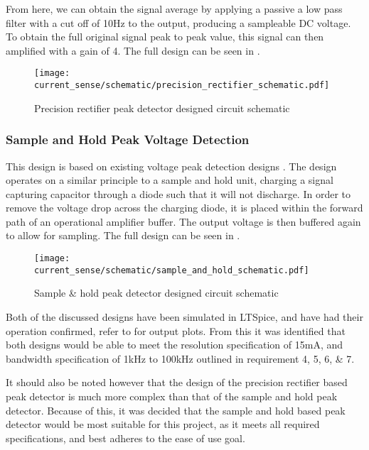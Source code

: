 From here, we can obtain the signal average by applying a passive a low pass filter with a cut off of 10Hz to the output, producing a sampleable DC voltage. To obtain the full original signal peak to peak value, this signal can then amplified with a gain of 4. The full design can be seen in .

\begin{figure}[!h]
    \centering
    \texttt{[image: current\_sense/schematic/precision\_rectifier\_schematic.pdf]}
    \caption{Precision rectifier peak detector designed circuit schematic}
    \label{F:precision_rectifier_circuit}
\end{figure}


\subsubsection*{Sample and Hold Peak Voltage Detection}\label{S:current_sense_sample_and_hold_design}

This design is based on existing voltage peak detection designs \cite{peak_detector_designs,LTC6244_peak_detector}. The design operates on a similar principle to a sample and hold unit, charging a signal capturing capacitor through a diode such that it will not discharge. In order to remove the voltage drop across the charging diode, it is placed within the forward path of an operational amplifier buffer. The output voltage is then buffered again to allow for sampling. The full design can be seen in .

\begin{figure}[!h]
    \centering
    \texttt{[image: current\_sense/schematic/sample\_and\_hold\_schematic.pdf]}
    \caption{Sample \& hold peak detector designed circuit schematic}
    \label{F:sample_and_hold_circuit}
\end{figure}

Both of the discussed designs have been simulated in LTSpice, and have had their operation confirmed, refer to  for output plots. From this it was identified that both designs would be able to meet the resolution specification of 15mA, and bandwidth specification of 1kHz to 100kHz outlined in requirement 4, 5, 6, \& 7.

It should also be noted however that the design of the precision rectifier based peak detector is much more complex than that of the sample and hold peak detector. Because of this, it was decided that the sample and hold based peak detector would be most suitable for this project, as it meets all required specifications, and best adheres to the ease of use goal.


